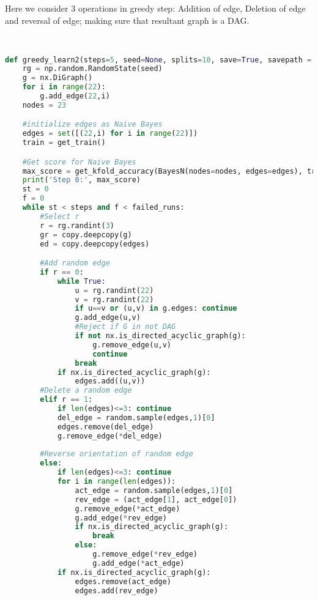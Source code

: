 \documentclass[addpoints,11pt,a4paper]{exam}
\begin{document}
\begin{questions}
\begin{parts}
\begin{solution}
Here we consider 3 operations in greedy step: Addition of edge, Deletion of edge and reversal of edge; making sure that resultant graph is a DAG.

\begin{lstlisting}[language=Python, style=mystyle]


def greedy_learn2(steps=5, seed=None, splits=10, save=True, savepath = 'submissions/greedy.csv', failed_runs=10000):
    rg = np.random.RandomState(seed)
    g = nx.DiGraph()
    for i in range(22):
        g.add_edge(22,i)
    nodes = 23

    #initialize edges as Naive Bayes
    edges = set([(22,i) for i in range(22)])
    train = get_train()

    #Get score for Naive Bayes
    max_score = get_kfold_accuracy(BayesN(nodes=nodes, edges=edges), train, splits)
    print('Step 0:', max_score)
    st = 0
    f = 0
    while st < steps and f < failed_runs:
        #Select r
        r = rg.randint(3)
        gr = copy.deepcopy(g)
        ed = copy.deepcopy(edges)

        #Add random edge
        if r == 0:
            while True:
                u = rg.randint(22)
                v = rg.randint(22)
                if u==v or (u,v) in g.edges: continue
                g.add_edge(u,v)
                #Reject if G in not DAG
                if not nx.is_directed_acyclic_graph(g):
                    g.remove_edge(u,v)
                    continue
                break
            if nx.is_directed_acyclic_graph(g):
                edges.add((u,v))
        #Delete a random edge
        elif r == 1:
            if len(edges)<=3: continue
            del_edge = random.sample(edges,1)[0]
            edges.remove(del_edge)
            g.remove_edge(*del_edge)
        
        #Reverse orientation of random edge
        else:
            if len(edges)<=3: continue
            for i in range(len(edges)):
                act_edge = random.sample(edges,1)[0]
                rev_edge = (act_edge[1], act_edge[0])
                g.remove_edge(*act_edge)
                g.add_edge(*rev_edge)
                if nx.is_directed_acyclic_graph(g): 
                    break
                else:
                    g.remove_edge(*rev_edge)
                    g.add_edge(*act_edge)
            if nx.is_directed_acyclic_graph(g):
                edges.remove(act_edge)
                edges.add(rev_edge)
                

\end{lstlisting}
\end{solution}
\end{parts}
\end{questions}
\end{document}
